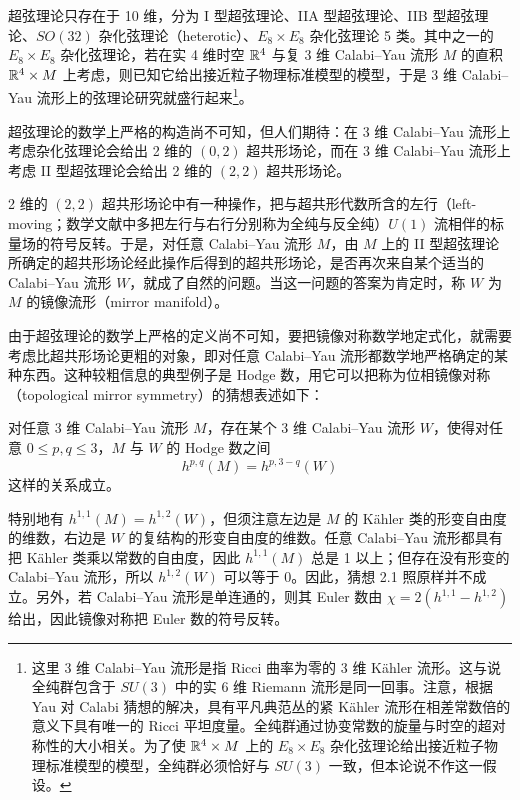 
超弦理论只存在于 10 维，分为 I 型超弦理论、IIA 型超弦理论、IIB 型超弦理论、$SO(32)$ 杂化弦理论（heterotic）、$E_8\times E_8$ 杂化弦理论 5 类。其中之一的 $E_8\times E_8$ 杂化弦理论，若在实 4 维时空 $\mathbb{R}^4$ 与复 3 维 Calabi–Yau 流形 $M$ 的直积 $\mathbb{R}^4\times M$ 上考虑，则已知它给出接近粒子物理标准模型的模型，于是 3 维 Calabi–Yau 流形上的弦理论研究就盛行起来\footnote{这里 3 维 Calabi–Yau 流形是指 Ricci 曲率为零的 3 维 Kähler 流形。这与说全纯群包含于 $SU(3)$ 中的实 6 维 Riemann 流形是同一回事。注意，根据 Yau 对 Calabi 猜想的解决，具有平凡典范丛的紧 Kähler 流形在相差常数倍的意义下具有唯一的 Ricci 平坦度量。全纯群通过协变常数的旋量与时空的超对称性的大小相关。为了使 $\mathbb{R}^4\times M$ 上的 $E_8\times E_8$ 杂化弦理论给出接近粒子物理标准模型的模型，全纯群必须恰好与 $SU(3)$ 一致，但本论说不作这一假设。}。

超弦理论的数学上严格的构造尚不可知，但人们期待：在 3 维 Calabi–Yau 流形上考虑杂化弦理论会给出 2 维的 $(0,2)$ 超共形场论，而在 3 维 Calabi–Yau 流形上考虑 II 型超弦理论会给出 2 维的 $(2,2)$ 超共形场论。

2 维的 $(2,2)$ 超共形场论中有一种操作，把与超共形代数所含的左行（left-moving；数学文献中多把左行与右行分别称为全纯与反全纯）$U(1)$ 流相伴的标量场的符号反转。于是，对任意 Calabi–Yau 流形 $M$，由 $M$ 上的 II 型超弦理论所确定的超共形场论经此操作后得到的超共形场论，是否再次来自某个适当的 Calabi–Yau 流形 $W$，就成了自然的问题。当这一问题的答案为肯定时，称 $W$ 为 $M$ 的镜像流形（mirror manifold）。

由于超弦理论的数学上严格的定义尚不可知，要把镜像对称数学地定式化，就需要考虑比超共形场论更粗的对象，即对任意 Calabi–Yau 流形都数学地严格确定的某种东西。这种较粗信息的典型例子是 Hodge 数，用它可以把称为位相镜像对称（topological mirror symmetry）的猜想表述如下：

 对任意 3 维 Calabi–Yau 流形 $M$，存在某个 3 维 Calabi–Yau 流形 $W$，使得对任意 $0\le p,q\le3$，$M$ 与 $W$ 的 Hodge 数之间
\begin{equation}
    h^{p,q}(M)=h^{p,3-q}(W) \tag{2.4}
\end{equation}
这样的关系成立。

特别地有 $h^{1,1}(M)=h^{1,2}(W)$，但须注意左边是 $M$ 的 Kähler 类的形变自由度的维数，右边是 $W$ 的复结构的形变自由度的维数。任意 Calabi–Yau 流形都具有把 Kähler 类乘以常数的自由度，因此 $h^{1,1}(M)$ 总是 1 以上；但存在没有形变的 Calabi–Yau 流形，所以 $h^{1,2}(W)$ 可以等于 0。因此，猜想 2.1 照原样并不成立。另外，若 Calabi–Yau 流形是单连通的，则其 Euler 数由 $\chi=2(h^{1,1}-h^{1,2})$ 给出，因此镜像对称把 Euler 数的符号反转。


